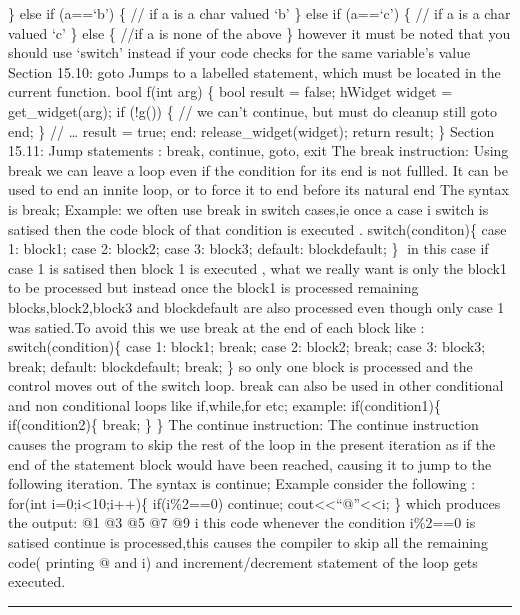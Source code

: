 \} else if (a==`b') \{ // if a is a char valued `b' \} else if (a==`c')
\{ // if a is a char valued `c' \} else \{ //if a is none of the above
\} however it must be noted that you should use `switch' instead if your
code checks for the same variable's value Section 15.10: goto Jumps to a
labelled statement, which must be located in the current function. bool
f(int arg) \{ bool result = false; hWidget widget = get\_widget(arg); if
(!g()) \{ // we can't continue, but must do cleanup still goto end; \}
// \ldots{} result = true; end: release\_widget(widget); return result;
\} Section 15.11: Jump statements : break, continue, goto, exit The
break instruction: Using break we can leave a loop even if the condition
for its end is not fullled. It can be used to end an innite loop, or to
force it to end before its natural end The syntax is break; Example: we
often use break in switch cases,ie once a case i switch is satised then
the code block of that condition is executed . switch(conditon)\{ case
1: block1; case 2: block2; case 3: block3; default: blockdefault; \} in
this case if case 1 is satised then block 1 is executed , what we really
want is only the block1 to be processed but instead once the block1 is
processed remaining blocks,block2,block3 and blockdefault are also
processed even though only case 1 was satied.To avoid this we use break
at the end of each block like : switch(condition)\{ case 1: block1;
break; case 2: block2; break; case 3: block3; break; default:
blockdefault; break; \} so only one block is processed and the control
moves out of the switch loop. break can also be used in other
conditional and non conditional loops like if,while,for etc; example:
if(condition1)\{ if(condition2)\{ break; \} \} The continue instruction:
The continue instruction causes the program to skip the rest of the loop
in the present iteration as if the end of the statement block would have
been reached, causing it to jump to the following iteration. The syntax
is continue; Example consider the following : for(int
i=0;i\textless10;i++)\{ if(i\%2==0) continue;
cout\textless\textless{}``\n @''\textless\textless i; \} which produces
the output: @1 @3 @5 @7 @9 i this code whenever the condition i\%2==0 is
satised continue is processed,this causes the compiler to skip all the
remaining code( printing @ and i) and increment/decrement statement of
the loop gets executed.

\begin{center}\rule{0.5\linewidth}{0.5pt}\end{center}
